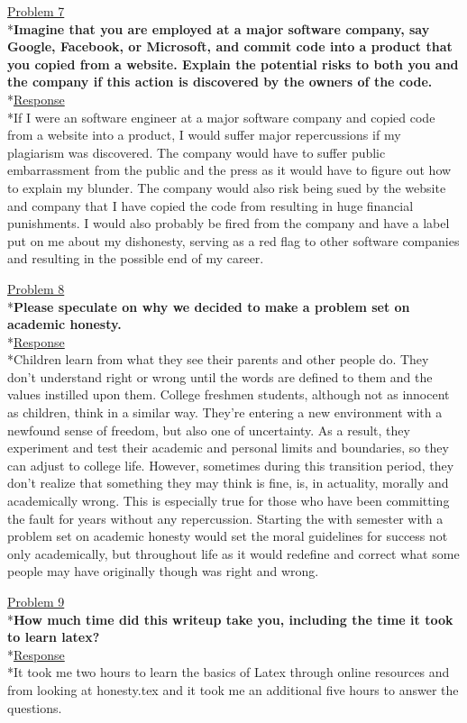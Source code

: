 \documentclass[11pt]{article}
\begin{document}
\noindent
\uline{Problem 7}
\\*\textbf{Imagine that you are employed at a major software company, say Google, Facebook, or Microsoft, and commit code into a product that you copied from a website. Explain the potential risks to both you and the company if this action is discovered by the owners of the code.}
\medskip
\\*\uline{Response}
\\*If I were an software engineer at a major software company and copied code from a website into a product, I would suffer major repercussions if my plagiarism was discovered. The company would have to suffer public embarrassment from the public and the press as it would have to figure out how to explain my blunder. The company would also risk being sued by the website and company that I have copied the code from resulting in huge financial punishments. I would also probably be fired from the company and have a label put on me about my dishonesty, serving as a red flag to other software companies and resulting in the possible end of my career. 
\bigskip\bigskip

\noindent
\uline{Problem 8}
\\*\textbf{Please speculate on why we decided to make a problem set on academic honesty.}
\medskip
\\*\uline{Response}
\\*Children learn from what they see their parents and other people do. They don't understand right or wrong until the words are defined to them and the values instilled upon them. College freshmen students, although not as innocent as children, think in a similar way. They're entering a new environment with a newfound sense of freedom, but also one of uncertainty. As a result, they experiment and test their academic and personal limits and boundaries, so they can adjust to college life. However, sometimes during this transition period, they don't realize that something they may think is fine, is, in actuality, morally and academically wrong. This is especially true for those who have been committing the fault for years without any repercussion. Starting the with semester with a problem set on academic honesty would set the moral guidelines for success not only academically, but throughout life as it would redefine and correct what some people may have originally though was right and wrong. 
\bigskip\bigskip

\noindent
\uline{Problem 9}
\\*\textbf{How much time did this writeup take you, including the time it took to learn latex?}
\medskip
\\*\uline{Response}
\\*It took me two hours to learn the basics of Latex through online resources and from looking at honesty.tex and it took me an additional five hours to answer the questions.
\bigskip\bigskip
\end{document}
